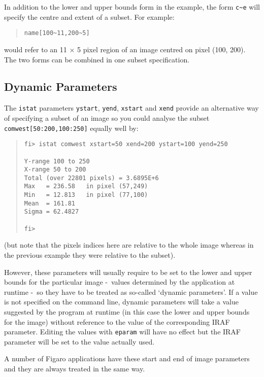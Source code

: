 \documentclass[twoside,11pt]{article}
\newcommand{\htmlref}[2]{#1}
\newcommand{\xlabel}[1]{}
\newcommand{\dash}{--}
\renewcommand{\dash}{-}
\begin{document}
In addition to the lower and upper bounds form in the example, the form
\verb!c~e! will specify the centre and extent of a subset. For example:
\begin{quote} \begin{verbatim}
name[100~11,200~5] 
\end{verbatim} \end{quote}
would refer to an 11 $\times$ 5 pixel region of an image centred on pixel 
(100, 200). 
The two forms can be combined in one subset specification.

\subsection{\xlabel{dynamic_parameters}Dynamic Parameters}
The \texttt{istat} parameters \texttt{ystart}, \texttt{yend}, \texttt{xstart} 
and \texttt{xend} provide an alternative way of specifying a subset of an image
so you could analyse the subset \texttt{comwest[50:200,100:250]} equally well 
by:
\begin{quote} \begin{verbatim}
fi> istat comwest xstart=50 xend=200 ystart=100 yend=250

Y-range 100 to 250
X-range 50 to 200
Total (over 22801 pixels) = 3.6895E+6
Max   = 236.58   in pixel (57,249)
Min   = 12.813   in pixel (77,100)
Mean  = 161.81
Sigma = 62.4827

fi>
\end{verbatim} \end{quote}
(but note that the pixels indices here are relative to the whole image whereas 
in the previous example they were relative to the subset).

However, these parameters will usually require to be set to the lower and
upper bounds for the particular image \dash\ values determined by the application
at runtime \dash\ so they have to be treated as so-called
\htmlref{`dynamic parameters'}{more_on_dynamic_parameters}. 
If a value is not specified on the command line, dynamic parameters
will take a value suggested by the program at runtime (in this
case the lower and upper bounds for the image) without reference to the value 
of the corresponding IRAF parameter. Editing the values with \texttt{eparam} 
will have no effect but the IRAF parameter will be set to the value actually 
used.

A number of Figaro applications have these start and end of image parameters 
and they are always treated in the same way.
\end{document}

